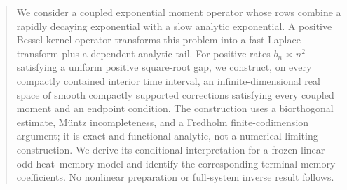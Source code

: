 \begin{abstract}
We consider a coupled exponential moment operator whose rows combine a rapidly decaying exponential with a slow analytic exponential. A positive Bessel-kernel operator transforms this problem into a fast Laplace transform plus a dependent analytic tail. For positive rates \(b_n\asymp n^2\) satisfying a uniform positive square-root gap, we construct, on every compactly contained interior time interval, an infinite-dimensional real space of smooth compactly supported corrections satisfying every coupled moment and an endpoint condition. The construction uses a biorthogonal estimate, Müntz incompleteness, and a Fredholm finite-codimension argument; it is exact and functional analytic, not a numerical limiting construction. We derive its conditional interpretation for a frozen linear odd heat--memory model and identify the corresponding terminal-memory coefficients. No nonlinear preparation or full-system inverse result follows.
\end{abstract}
